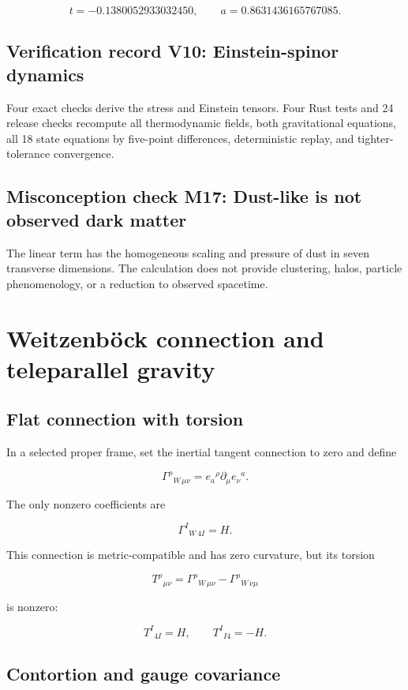 \documentclass[11pt]{article}
\begin{document}
\[
t=-0.1380052933032450,
\qquad a=0.8631436165767085.
\]

\subsection{Verification record V10: Einstein-spinor dynamics}

Four exact checks derive the stress and Einstein tensors. Four Rust tests and 24 release checks recompute all thermodynamic fields, both gravitational equations, all 18 state equations by five-point differences, deterministic replay, and tighter-tolerance convergence.

\subsection{Misconception check M17: Dust-like is not observed dark matter}

The linear term has the homogeneous scaling and pressure of dust in seven transverse dimensions. The calculation does not provide clustering, halos, particle phenomenology, or a reduction to observed spacetime.

\section{Weitzenböck connection and teleparallel gravity}

\subsection{Flat connection with torsion}

In a selected proper frame, set the inertial tangent connection to zero and define

\[
\Gamma^\rho{}_{W\,\mu\nu}
=e_a{}^\rho\partial_\mu e_\nu{}^a.
\]

The only nonzero coefficients are

\[
\Gamma^I{}_{W\,4I}=H.
\]

This connection is metric-compatible and has zero curvature, but its torsion

\[
T^\rho{}_{\mu\nu}
=\Gamma^\rho{}_{W\,\mu\nu}-\Gamma^\rho{}_{W\,\nu\mu}
\]

is nonzero:

\[
T^I{}_{4I}=H,
\qquad T^I{}_{I4}=-H.
\]

\subsection{Contortion and gauge covariance}
\end{document}

